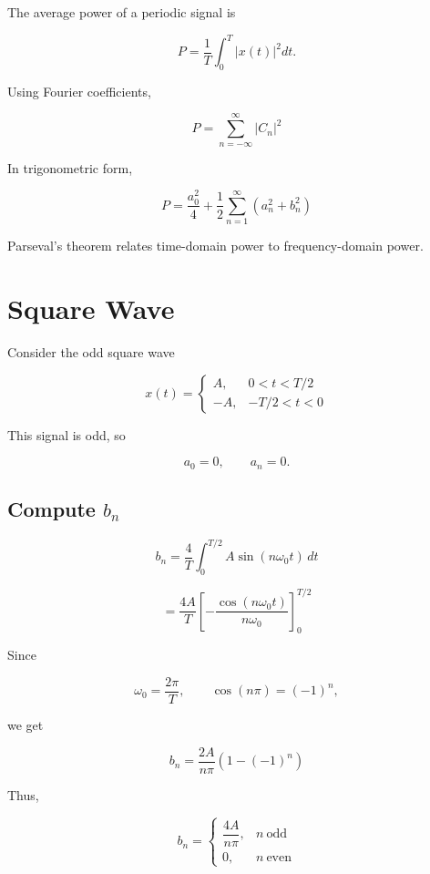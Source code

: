 The average power of a periodic signal is

\[
P=
\frac{1}{T}\int_0^T |x(t)|^2dt.
\]

Using Fourier coefficients,

\[
\boxed{
P=
\sum_{n=-\infty}^{\infty}|C_n|^2
}
\]

In trigonometric form,

\[
\boxed{
P=
\frac{a_0^2}{4}
+
\frac{1}{2}
\sum_{n=1}^{\infty}(a_n^2+b_n^2)
}
\]

Parseval's theorem relates time-domain power to frequency-domain power.


\section{Square Wave}

Consider the odd square wave

\[
x(t)=
\begin{cases}
A, & 0<t<T/2\\
-A, & -T/2<t<0
\end{cases}
\]

This signal is odd, so

\[
a_0=0,\qquad a_n=0.
\]


\subsection{Compute \(b_n\)}

\[
b_n=
\frac{4}{T}
\int_0^{T/2}
A\sin(n\omega_0 t)\,dt
\]

\[
=
\frac{4A}{T}
\left[
-\frac{\cos(n\omega_0 t)}{n\omega_0}
\right]_0^{T/2}
\]

Since

\[
\omega_0=\frac{2\pi}{T},
\qquad
\cos(n\pi)=(-1)^n,
\]

we get

\[
\boxed{
b_n=
\frac{2A}{n\pi}
\left(1-(-1)^n\right)
}
\]

Thus,

\[
b_n=
\begin{cases}
\dfrac{4A}{n\pi}, & n\ \text{odd}\\[6pt]
0, & n\ \text{even}
\end{cases}
\]


